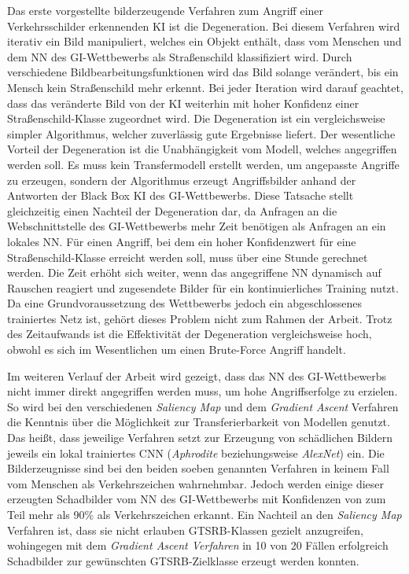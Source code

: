 Das erste vorgestellte bilderzeugende Verfahren zum Angriff einer Verkehrsschilder erkennenden \ac{KI} ist die Degeneration. Bei diesem Verfahren wird iterativ ein Bild manipuliert, welches ein Objekt enthält, dass vom Menschen und dem \ac{NN} des \ac{GI}-Wettbewerbs als Straßenschild klassifiziert wird. Durch verschiedene Bildbearbeitungsfunktionen wird das Bild solange verändert, bis ein Mensch kein Straßenschild mehr erkennt. Bei jeder Iteration wird darauf geachtet, dass das veränderte Bild von der \ac{KI} weiterhin mit hoher Konfidenz einer Straßenschild-Klasse zugeordnet wird. Die Degeneration ist ein vergleichsweise simpler Algorithmus, welcher zuverlässig gute Ergebnisse liefert. Der wesentliche Vorteil der Degeneration ist die Unabhängigkeit vom Modell, welches angegriffen werden soll. Es muss kein Transfermodell erstellt werden, um angepasste Angriffe zu erzeugen, sondern der Algorithmus erzeugt Angriffsbilder anhand der Antworten der Black Box \ac{KI} des \ac{GI}-Wettbewerbs. Diese Tatsache stellt gleichzeitig einen Nachteil der Degeneration dar, da Anfragen an die Webschnittstelle des \ac{GI}-Wettbewerbs mehr Zeit benötigen als Anfragen an ein lokales \ac{NN}. Für einen Angriff, bei dem ein hoher Konfidenzwert für eine Straßenschild-Klasse erreicht werden soll, muss über eine Stunde gerechnet werden. Die Zeit erhöht sich weiter, wenn das angegriffene \ac{NN} dynamisch auf Rauschen reagiert und zugesendete Bilder für ein kontinuierliches Training nutzt. Da eine Grundvoraussetzung des Wettbewerbs jedoch ein abgeschlossenes trainiertes Netz ist, gehört dieses Problem nicht zum Rahmen der Arbeit. Trotz des Zeitaufwands ist die Effektivität der Degeneration vergleichsweise hoch, obwohl es sich im Wesentlichen um einen Brute-Force Angriff handelt. 

Im weiteren Verlauf der Arbeit wird gezeigt, dass das \ac{NN} des \ac{GI}-Wettbewerbs nicht immer direkt angegriffen werden muss, um hohe Angriffserfolge zu erzielen. So wird bei den verschiedenen \textit{Saliency Map} und dem \textit{Gradient Ascent} Verfahren die Kenntnis über die Möglichkeit zur Transferierbarkeit von Modellen genutzt. Das heißt, dass jeweilige Verfahren setzt zur Erzeugung von schädlichen Bildern jeweils ein lokal trainiertes \ac{CNN} (\textit{Aphrodite} beziehungsweise \textit{AlexNet}) ein. Die Bilderzeugnisse sind bei den beiden soeben genannten Verfahren in keinem Fall vom Menschen als Verkehrszeichen wahrnehmbar. Jedoch werden einige dieser erzeugten Schadbilder vom \ac{NN} des \ac{GI}-Wettbewerbs mit Konfidenzen von zum Teil mehr als 90\% als Verkehrszeichen erkannt. Ein Nachteil an den \textit{Saliency Map} Verfahren ist, dass sie nicht erlauben \ac{GTSRB}-Klassen gezielt anzugreifen, wohingegen mit dem \textit{Gradient Ascent Verfahren} in 10 von 20 Fällen erfolgreich Schadbilder zur gewünschten \ac{GTSRB}-Zielklasse erzeugt werden konnten.


